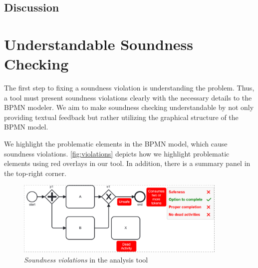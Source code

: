 \documentclass[runningheads]{llncs}
\begin{document}
\subsection{Discussion}


\section{Understandable Soundness Checking}

The first step to fixing a soundness violation is understanding the problem.
Thus, a tool must present soundness violations clearly with the necessary details to the BPMN modeler.
We aim to make soundness checking understandable by not only providing textual feedback but rather utilizing the graphical structure of the BPMN model.

We highlight the problematic elements in the BPMN model, which cause soundness violations.
\autoref{fig:violations} depicts how we highlight problematic elements using red overlays in our tool.
In addition, there is a summary panel in the top-right corner.

\begin{figure}[ht]
	\centering
	\includegraphics[width=0.9\textwidth]{images/violations}
	\caption{\textit{Soundness violations} in the analysis tool}
	\label{fig:violations}
\end{figure}
\end{document}
